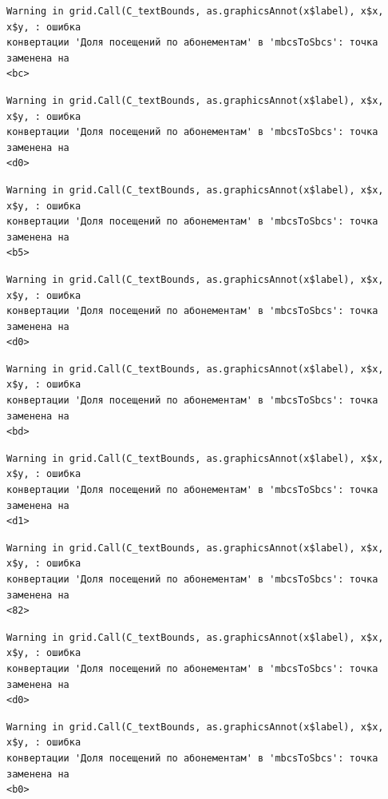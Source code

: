 \documentclass[
  letterpaper,
  DIV=11,
  numbers=noendperiod]{scrreprt}
\begin{document}
\begin{verbatim}
Warning in grid.Call(C_textBounds, as.graphicsAnnot(x$label), x$x, x$y, : ошибка
конвертации 'Доля посещений по абонементам' в 'mbcsToSbcs': точка заменена на
<bc>
\end{verbatim}

\begin{verbatim}
Warning in grid.Call(C_textBounds, as.graphicsAnnot(x$label), x$x, x$y, : ошибка
конвертации 'Доля посещений по абонементам' в 'mbcsToSbcs': точка заменена на
<d0>
\end{verbatim}

\begin{verbatim}
Warning in grid.Call(C_textBounds, as.graphicsAnnot(x$label), x$x, x$y, : ошибка
конвертации 'Доля посещений по абонементам' в 'mbcsToSbcs': точка заменена на
<b5>
\end{verbatim}

\begin{verbatim}
Warning in grid.Call(C_textBounds, as.graphicsAnnot(x$label), x$x, x$y, : ошибка
конвертации 'Доля посещений по абонементам' в 'mbcsToSbcs': точка заменена на
<d0>
\end{verbatim}

\begin{verbatim}
Warning in grid.Call(C_textBounds, as.graphicsAnnot(x$label), x$x, x$y, : ошибка
конвертации 'Доля посещений по абонементам' в 'mbcsToSbcs': точка заменена на
<bd>
\end{verbatim}

\begin{verbatim}
Warning in grid.Call(C_textBounds, as.graphicsAnnot(x$label), x$x, x$y, : ошибка
конвертации 'Доля посещений по абонементам' в 'mbcsToSbcs': точка заменена на
<d1>
\end{verbatim}

\begin{verbatim}
Warning in grid.Call(C_textBounds, as.graphicsAnnot(x$label), x$x, x$y, : ошибка
конвертации 'Доля посещений по абонементам' в 'mbcsToSbcs': точка заменена на
<82>
\end{verbatim}

\begin{verbatim}
Warning in grid.Call(C_textBounds, as.graphicsAnnot(x$label), x$x, x$y, : ошибка
конвертации 'Доля посещений по абонементам' в 'mbcsToSbcs': точка заменена на
<d0>
\end{verbatim}

\begin{verbatim}
Warning in grid.Call(C_textBounds, as.graphicsAnnot(x$label), x$x, x$y, : ошибка
конвертации 'Доля посещений по абонементам' в 'mbcsToSbcs': точка заменена на
<b0>
\end{verbatim}
\end{document}
